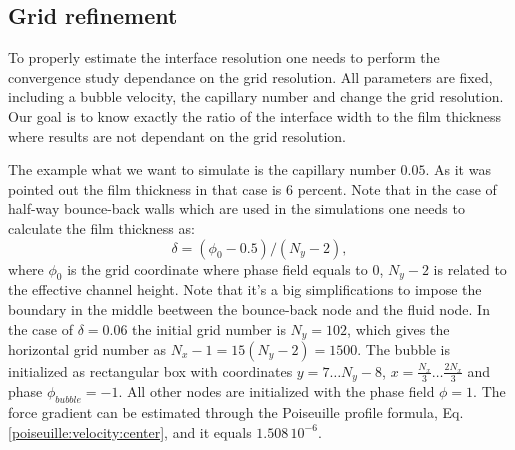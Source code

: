 \documentclass{article}
\begin{document}
\subsection{Grid refinement}
To properly estimate the interface resolution one needs to perform the
convergence study dependance on the grid resolution. All parameters are fixed,
including a bubble velocity, the capillary number and change the grid
resolution. Our goal is to know exactly the ratio of the interface width to the
film thickness where results are not dependant on the grid resolution. 

The example what we want to simulate is the capillary number
$0.05$. As it was pointed out the film thickness in that case is $6$ percent.
Note that in the case of half-way bounce-back walls which are used in the
simulations one needs to calculate the film thickness as: 
\begin{equation}
\delta=(\phi_0-0.5)/(N_y-2),
\end{equation}
where $\phi_0$ is the grid coordinate where phase field equals to $0$, $N_y-2$
is related to the effective channel height. Note that it's a big
simplifications to impose the boundary in the middle beetween the bounce-back
node and the fluid node. In the case of $\delta=0.06$ the initial grid number
is $N_y=102$, which gives the horizontal grid number as $N_x-1=15(N_y-2)=1500$.
The bubble is initialized as rectangular box with coordinates
$y=7\dots N_y-8$, $x=\frac{N_x}{3}\dots \frac{2 N_x}{3}$ and phase
$\phi_{bubble}=-1$. All other nodes are initialized with the phase field
$\phi=1$. The force gradient can be estimated through the Poiseuille
profile formula, Eq.\ref{poiseuille:velocity:center}, and it equals
$1.508\,10^{-6}$.
\end{document}
